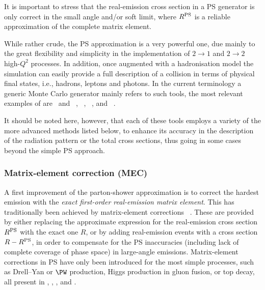 It is important to stress that the real-emission cross section in a PS 
generator is only correct in the small angle and/or soft limit, where
$R^{\rm PS}$ is a reliable approximation of the complete matrix element.

While rather crude, the PS approximation is a very powerful one, due mainly
to the great flexibility and simplicity in the implementation of
 $2 \to 1$ and $2\to 2$ high-$Q^2$ processes. In addition, once 
augmented with a hadronisation model the simulation can easily provide a 
full description of a collision in terms of physical final states, i.e., 
hadrons, leptons and photons.  In the current terminology a generic Monte 
Carlo generator mainly refers to such tools, the most relevant examples of are 
\pythiasix\ and \pythiaeight~\cite{Sjostrand:2006za,Sjostrand:2007gs}, 
\herwig~\cite{Corcella:2000bw}, \herwigpp~\cite{Bahr:2008pv}, and 
\sherpa~\cite{Gleisberg:2003xi}.  

It should be noted here, however, that each of these tools employs a 
variety of the more advanced methods listed below, to enhance its accuracy 
in the description of the radiation pattern or the total cross sections,
thus going in some cases beyond the simple PS approach.


\subsubsection{Matrix-element correction (MEC)}
\label{mec}
A first improvement of the parton-shower approximation is to correct
the hardest emission with the
{\em exact first-order real-emission matrix element}.
This has traditionally been achieved by matrix-element corrections%
~\cite{Bengtsson:1986hr,Gustafson:1987rq,Seymour:1994we,
Seymour:1994df,Miu:1998ju,Lonnblad:1995ex}. 
These are provided by either replacing the approximate expression for the 
real-emission cross section $R^{\rm PS}$ with the exact one $R$, or by adding 
real-emission events with a cross section $R-R^{\rm PS}$, in order to 
compensate for the PS inaccuracies (including lack of complete coverage of 
phase space) in large-angle emissions.  Matrix-element corrections in PS 
have only been introduced for the most simple processes, such as Drell--Yan or
$\PW$ production, Higgs production in gluon fusion, or top decay, all
present in \pythiasix, \pythiaeight, \herwig, and \herwigpp.  

